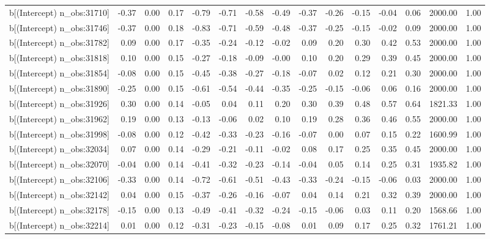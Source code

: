 \begin{table}[ht]
\begin{tabular}{rrrrrrrrrrrrrrr}
  b[(Intercept) n\_obs:31710] & -0.37 & 0.00 & 0.17 & -0.79 & -0.71 & -0.58 & -0.49 & -0.37 & -0.26 & -0.15 & -0.04 & 0.06 & 2000.00 & 1.00 \\ 
  b[(Intercept) n\_obs:31746] & -0.37 & 0.00 & 0.18 & -0.83 & -0.71 & -0.59 & -0.48 & -0.37 & -0.25 & -0.15 & -0.02 & 0.09 & 2000.00 & 1.00 \\ 
  b[(Intercept) n\_obs:31782] & 0.09 & 0.00 & 0.17 & -0.35 & -0.24 & -0.12 & -0.02 & 0.09 & 0.20 & 0.30 & 0.42 & 0.53 & 2000.00 & 1.00 \\ 
  b[(Intercept) n\_obs:31818] & 0.10 & 0.00 & 0.15 & -0.27 & -0.18 & -0.09 & -0.00 & 0.10 & 0.20 & 0.29 & 0.39 & 0.45 & 2000.00 & 1.00 \\ 
  b[(Intercept) n\_obs:31854] & -0.08 & 0.00 & 0.15 & -0.45 & -0.38 & -0.27 & -0.18 & -0.07 & 0.02 & 0.12 & 0.21 & 0.30 & 2000.00 & 1.00 \\ 
  b[(Intercept) n\_obs:31890] & -0.25 & 0.00 & 0.15 & -0.61 & -0.54 & -0.44 & -0.35 & -0.25 & -0.15 & -0.06 & 0.06 & 0.16 & 2000.00 & 1.00 \\ 
  b[(Intercept) n\_obs:31926] & 0.30 & 0.00 & 0.14 & -0.05 & 0.04 & 0.11 & 0.20 & 0.30 & 0.39 & 0.48 & 0.57 & 0.64 & 1821.33 & 1.00 \\ 
  b[(Intercept) n\_obs:31962] & 0.19 & 0.00 & 0.13 & -0.13 & -0.06 & 0.02 & 0.10 & 0.19 & 0.28 & 0.36 & 0.46 & 0.55 & 2000.00 & 1.00 \\ 
  b[(Intercept) n\_obs:31998] & -0.08 & 0.00 & 0.12 & -0.42 & -0.33 & -0.23 & -0.16 & -0.07 & 0.00 & 0.07 & 0.15 & 0.22 & 1600.99 & 1.00 \\ 
  b[(Intercept) n\_obs:32034] & 0.07 & 0.00 & 0.14 & -0.29 & -0.21 & -0.11 & -0.02 & 0.08 & 0.17 & 0.25 & 0.35 & 0.45 & 2000.00 & 1.00 \\ 
  b[(Intercept) n\_obs:32070] & -0.04 & 0.00 & 0.14 & -0.41 & -0.32 & -0.23 & -0.14 & -0.04 & 0.05 & 0.14 & 0.25 & 0.31 & 1935.82 & 1.00 \\ 
  b[(Intercept) n\_obs:32106] & -0.33 & 0.00 & 0.14 & -0.72 & -0.61 & -0.51 & -0.43 & -0.33 & -0.24 & -0.15 & -0.06 & 0.03 & 2000.00 & 1.00 \\ 
  b[(Intercept) n\_obs:32142] & 0.04 & 0.00 & 0.15 & -0.37 & -0.26 & -0.16 & -0.07 & 0.04 & 0.14 & 0.21 & 0.32 & 0.39 & 2000.00 & 1.00 \\ 
  b[(Intercept) n\_obs:32178] & -0.15 & 0.00 & 0.13 & -0.49 & -0.41 & -0.32 & -0.24 & -0.15 & -0.06 & 0.03 & 0.11 & 0.20 & 1568.66 & 1.00 \\ 
  b[(Intercept) n\_obs:32214] & 0.01 & 0.00 & 0.12 & -0.31 & -0.23 & -0.15 & -0.08 & 0.01 & 0.09 & 0.17 & 0.25 & 0.32 & 1761.21 & 1.00 \\ 

\end{tabular}
\end{table}
